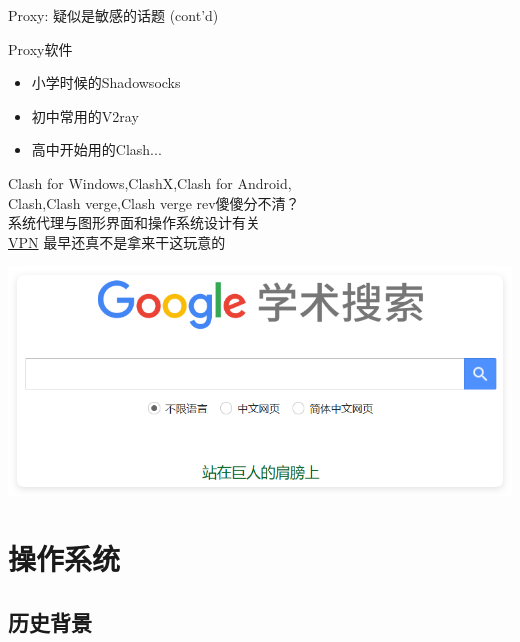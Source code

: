 \documentclass[aspectratio=1610]{beamer}
\begin{document}
\begin{frame}{Proxy: 疑似是敏感的话题 (cont'd)}
    \begin{minipage}{0.6\textwidth}
        Proxy软件
        \begin{center}
            \begin{itemize}
                \item 小学时候的Shadowsocks
                \item 初中常用的V2ray
                \item 高中开始用的Clash...
            \end{itemize}
        \end{center}
    
        Clash for Windows,ClashX,Clash for Android, \\
        Clash,Clash verge,Clash verge rev傻傻分不清？\\

        系统代理与图形界面和操作系统设计有关 \\
    
        \href{https://en.wikipedia.org/wiki/Virtual_private_network}{VPN} 最早还真不是拿来干这玩意的\footnotemark
    \end{minipage}
    \begin{minipage}{0.34\textwidth}
        \centering
        \includegraphics[width=\textwidth]{pic/Google.png}
    \end{minipage}

\end{frame}

\section{操作系统}

\subsection{历史背景}
\end{document}
